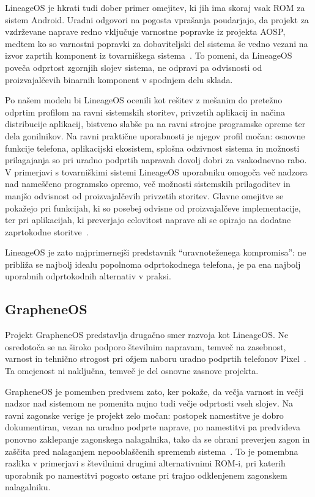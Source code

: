\documentclass[a4paper,12pt,openright]{book}
\begin{document}
LineageOS je hkrati tudi dober primer omejitev, ki jih ima skoraj vsak ROM za sistem Android.
Uradni odgovori na pogosta vprašanja poudarjajo, da projekt za vzdrževane naprave redno vključuje varnostne popravke iz projekta AOSP, medtem ko so varnostni popravki za dobaviteljski del sistema še vedno vezani na izvor zaprtih komponent iz tovarniškega sistema~\cite{lineageos_faq}.
To pomeni, da LineageOS poveča odprtost zgornjih slojev sistema, ne odpravi pa odvisnosti od proizvajalčevih binarnih komponent v spodnjem delu sklada.

Po našem modelu bi LineageOS ocenili kot rešitev z mešanim do pretežno odprtim profilom na ravni sistemskih storitev, privzetih aplikacij in načina distribucije aplikacij, bistveno slabše pa na ravni strojne programske opreme ter dela gonilnikov.
Na ravni praktične uporabnosti je njegov profil močan:
osnovne funkcije telefona, aplikacijski ekosistem, splošna odzivnost sistema in možnosti prilagajanja so pri uradno podprtih napravah dovolj dobri za vsakodnevno rabo.
V primerjavi s tovarniškimi sistemi LineageOS uporabniku omogoča več nadzora nad nameščeno programsko opremo, več možnosti sistemskih prilagoditev in manjšo odvisnost od proizvajalčevih privzetih storitev.
Glavne omejitve se pokažejo pri funkcijah, ki so posebej odvisne od proizvajalčeve implementacije, ter pri aplikacijah, ki preverjajo celovitost naprave ali se opirajo na dodatne zaprtokodne storitve~\cite{play_integrity_overview}.

LineageOS je zato najprimernejši predstavnik \enquote{uravnoteženega kompromisa}: ne približa se najbolj idealu popolnoma odprtokodnega telefona, je pa ena najbolj uporabnih odprtokodnih alternativ v praksi.

\subsection{GrapheneOS}

Projekt GrapheneOS predstavlja drugačno smer razvoja kot LineageOS.
Ne osredotoča se na široko podporo številnim napravam, temveč na zasebnost, varnost in tehnično strogost pri ožjem naboru uradno podprtih telefonov Pixel~\cite{grapheneos_about,grapheneos_faq}.
Ta omejenost ni naključna, temveč je del osnovne zasnove projekta.

GrapheneOS je pomemben predvsem zato, ker pokaže, da večja varnost in večji nadzor nad sistemom ne pomenita nujno tudi večje odprtosti vseh slojev.
Na ravni zagonske verige je projekt zelo močan:
postopek namestitve je dobro dokumentiran, vezan na uradno podprte naprave, po namestitvi pa predvideva ponovno zaklepanje zagonskega nalagalnika, tako da se ohrani preverjen zagon in zaščita pred nalaganjem nepooblaščenih sprememb sistema~\cite{grapheneos_install}.
To je pomembna razlika v primerjavi s številnimi drugimi alternativnimi ROM-i, pri katerih uporabnik po namestitvi pogosto ostane pri trajno odklenjenem zagonskem nalagalniku.
\end{document}
